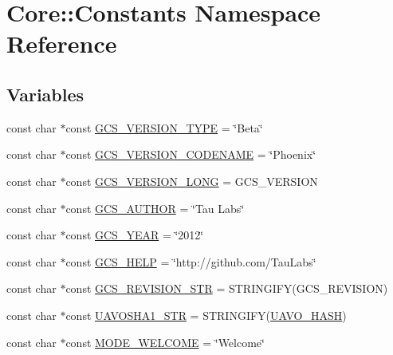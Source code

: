 \hypertarget{namespace_core_1_1_constants}{\section{Core\-:\-:Constants Namespace Reference}
\label{namespace_core_1_1_constants}
}
\subsection*{Variables}
\begin{DoxyCompactItemize}
\item 
const char $\ast$const \hyperlink{group___core_plugin_ga2f5847f505e3abb79af9a5dce306f252}{G\-C\-S\-\_\-\-V\-E\-R\-S\-I\-O\-N\-\_\-\-T\-Y\-P\-E} = \char`\"{}Beta\char`\"{}
\item 
const char $\ast$const \hyperlink{group___core_plugin_gad9af54d61e473a2cf1b31c9e834508fa}{G\-C\-S\-\_\-\-V\-E\-R\-S\-I\-O\-N\-\_\-\-C\-O\-D\-E\-N\-A\-M\-E} = \char`\"{}Phoenix\char`\"{}
\item 
const char $\ast$const \hyperlink{group___core_plugin_ga94cc5148063bb8fd71e94b6929e8c9ee}{G\-C\-S\-\_\-\-V\-E\-R\-S\-I\-O\-N\-\_\-\-L\-O\-N\-G} = G\-C\-S\-\_\-\-V\-E\-R\-S\-I\-O\-N
\item 
const char $\ast$const \hyperlink{group___core_plugin_ga0fc313e054a5095ee3ad71045b158aa6}{G\-C\-S\-\_\-\-A\-U\-T\-H\-O\-R} = \char`\"{}Tau Labs\char`\"{}
\item 
const char $\ast$const \hyperlink{group___core_plugin_ga97ec848a45099fd02d76df0a864d4c4a}{G\-C\-S\-\_\-\-Y\-E\-A\-R} = \char`\"{}2012\char`\"{}
\item 
const char $\ast$const \hyperlink{group___core_plugin_gaee8fed47fa9e32c041c48dbcbb51eac9}{G\-C\-S\-\_\-\-H\-E\-L\-P} = \char`\"{}http\-://github.\-com/Tau\-Labs\char`\"{}
\item 
const char $\ast$const \hyperlink{group___core_plugin_ga6978a5ac87f3d9dcd891f1be551d3b87}{G\-C\-S\-\_\-\-R\-E\-V\-I\-S\-I\-O\-N\-\_\-\-S\-T\-R} = S\-T\-R\-I\-N\-G\-I\-F\-Y(G\-C\-S\-\_\-\-R\-E\-V\-I\-S\-I\-O\-N)
\item 
const char $\ast$const \hyperlink{group___core_plugin_gaac836dc44aa34c08b486b01e3016f5c8}{U\-A\-V\-O\-S\-H\-A1\-\_\-\-S\-T\-R} = S\-T\-R\-I\-N\-G\-I\-F\-Y(\hyperlink{uavobjecttemplate_8m_a68fc75536e7a45155ef9f2214915c628}{U\-A\-V\-O\-\_\-\-H\-A\-S\-H})
\item 
const char $\ast$const \hyperlink{group___core_plugin_ga1b8ce8070e58b69888be921bbb6b03ce}{M\-O\-D\-E\-\_\-\-W\-E\-L\-C\-O\-M\-E} = \char`\"{}Welcome\char`\"{}

\end{DoxyCompactItemize}
